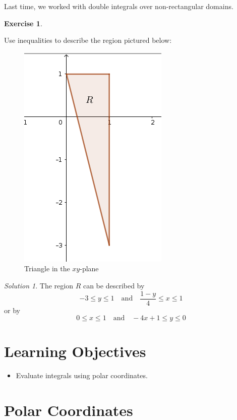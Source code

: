 \documentclass[
]{book}
\providecommand{\tightlist}{%
  \setlength{\itemsep}{0pt}\setlength{\parskip}{0pt}}
\theoremstyle{definition}
\theoremstyle{definition}
\theoremstyle{definition}
\newtheorem{exercise}{Exercise}[chapter]
\theoremstyle{definition}
\theoremstyle{remark}
\newtheorem*{solution}{Solution}
\begin{document}
Last time, we worked with double integrals over non-rectangular domains.

\begin{exercise}
\protect\hypertarget{exr:unlabeled-div-89}{}\label{exr:unlabeled-div-89}

Use inequalities to describe the region pictured below:

\begin{figure}

{\centering \includegraphics[width=0.3\linewidth]{images/lec-12-recap} 

}

\caption{Triangle in the $xy$-plane}\label{fig:unnamed-chunk-24}
\end{figure}

\end{exercise}

\begin{solution}

The region \(R\) can be described by \[-3\leq y \leq 1 \quad \mbox{and}\quad \dfrac{1-y}{4}\leq x\leq 1\] or by \[0\leq x\leq 1 \quad \mbox{and}\quad -4x+1\leq y \leq 0 \]

\end{solution}

\hypertarget{learning-objectives-11}{%
\section{Learning Objectives}\label{learning-objectives-11}}

\begin{itemize}
\tightlist
\item
  Evaluate integrals using polar coordinates.
\end{itemize}

\hypertarget{polar-coordinates}{%
\section{Polar Coordinates}\label{polar-coordinates}}
\end{document}
